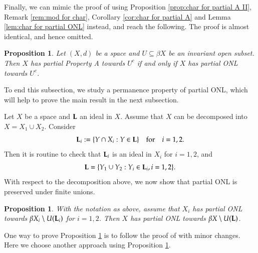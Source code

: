 \documentclass[12pt, a4paper]{amsart}
\numberwithin{equation}{section}
\newtheorem{lem}[thm]{Lemma}
\newtheorem{prop}[thm]{Proposition}
\theoremstyle{definition}
\theoremstyle{remark}
\def\H{\mathcal{H}}
\def\L{\mathcal{L}}
\def\B{\mathfrak{B}}
\def\cb{\mathrm{cb}}
\def\L{{\bf L}}
\begin{document}
%



Finally, we can mimic the proof of \cite[Theorem 4.1]{Sak14} using Proposition \ref{prop:char for partial A II}, Remark \ref{rem:mod for char}, Corollary \ref{cor:char for partial A} and Lemma \ref{lem:char for partial ONL} instead, and reach the following. The proof is almost identical, and hence omitted.

\begin{prop}\label{prop:partial A = partial ONL}
Let $(X,d)$ be a space and $U \subseteq \beta X$ be an invariant open subset. Then $X$ has partial Property A towards $U^c$ \emph{if and only if} $X$ has partial ONL towards $U^c$.
\end{prop}


To end this subsection, we study a permanence property of partial ONL, which will help to prove the main result in the next subsection. 

Let $X$ be a space and $\L$ an ideal in $X$. Assume that $X$ can be decomposed into $X = X_1 \cup X_2$. Consider 
\begin{equation}\label{EQ:restriction of ideals}
\L_i:=\{Y \cap X_i: Y \in \L\} \quad \text{for} \quad i=1,2.
\end{equation}
Then it is routine to check that $\L_i$ is an ideal in $X_i$ for $i=1,2$, and 
\[
\L=\{Y_1 \cup Y_2: Y_i \in \L_i, i=1,2\}.
\]
With respect to the decomposition above, we now show that partial ONL is preserved under finite unions.

\begin{prop}\label{prop:permanence for partial ONL}
With the notation as above, assume that $X_i$ has partial ONL towards $\beta X_i \setminus U(\L_i)$ for $i=1,2$. Then $X$ has partial ONL towards $\beta X \setminus U(\L)$.
\end{prop}

One way to prove Proposition \ref{prop:permanence for partial ONL} is to follow the proof of \cite[Lemma 3.3]{CWW09} with minor changes. Here we choose another approach using Proposition \ref{prop:partial A = partial ONL}.
\end{document}
